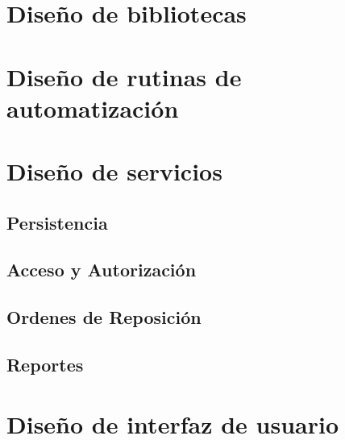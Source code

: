 \section{Diseño de bibliotecas}




\section{Diseño de rutinas de automatización}




\section{Diseño de servicios}
\subsection{Persistencia}
\subsection{Acceso y Autorización}
\subsection{Ordenes de Reposición}
\subsection{Reportes}




\section{Diseño de interfaz de usuario}



